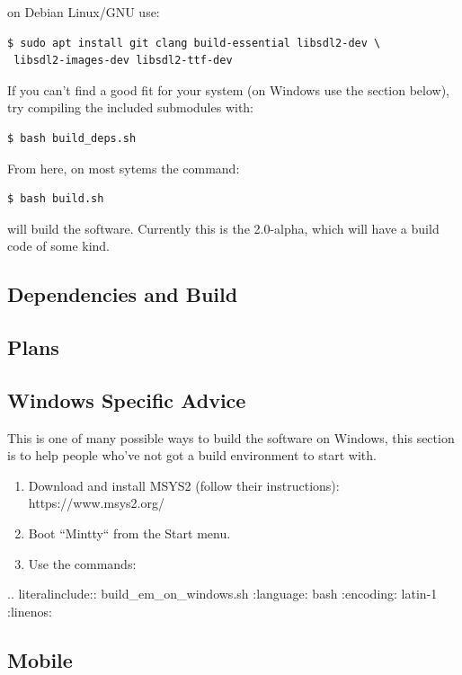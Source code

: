 \documentclass[a4paper]{report}
\begin{document}
on Debian Linux/GNU use:

\begin{lstlisting}
$ sudo apt install git clang build-essential libsdl2-dev \
 libsdl2-images-dev libsdl2-ttf-dev
\end{lstlisting}

If you can't find a good fit for your system (on Windows use the section below),
try compiling the included submodules with:

\begin{lstlisting}
$ bash build_deps.sh
\end{lstlisting}

From here, on most sytems the command:

\begin{lstlisting}
$ bash build.sh
\end{lstlisting}

will build the software. Currently this is the 2.0-alpha, which will have a build code of
some kind.

\subsection{Dependencies and Build}

\subsection{Plans}

\subsection{Windows Specific Advice}

This is one of many possible ways to build the software on Windows,
this section is to help people who've not got a build environment to start with.

\begin{enumerate}
\item Download and install MSYS2 (follow their instructions): https://www.msys2.org/
\item Boot ``Mintty`` from the Start menu.
\item Use the commands:
\end{enumerate}

.. literalinclude:: build\_em\_on\_windows.sh
   :language: bash
   :encoding: latin-1
   :linenos:

\subsection{Mobile}
\end{document}
